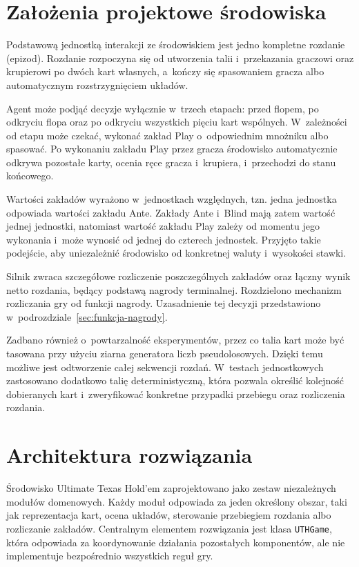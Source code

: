 \section{Założenia projektowe środowiska}
\label{sec:zalozenia-srodowiska}

Podstawową jednostką interakcji ze środowiskiem jest jedno kompletne rozdanie (epizod).
Rozdanie rozpoczyna się od utworzenia talii i~przekazania graczowi oraz
krupierowi po dwóch kart własnych, a~kończy się spasowaniem gracza albo
automatycznym rozstrzygnięciem układów.

Agent może podjąć decyzje wyłącznie w~trzech etapach: przed flopem, po odkryciu
flopa oraz po odkryciu wszystkich pięciu kart wspólnych. W~zależności od etapu
może czekać, wykonać zakład Play o~odpowiednim mnożniku albo spasować.
Po wykonaniu zakładu Play przez gracza środowisko automatycznie odkrywa pozostałe karty,
ocenia ręce gracza i~krupiera, i~przechodzi do stanu końcowego.

Wartości zakładów wyrażono w~jednostkach względnych, tzn. jedna jednostka
odpowiada wartości zakładu Ante. Zakłady Ante i~Blind mają zatem wartość
jednej jednostki, natomiast wartość zakładu Play zależy od momentu jego
wykonania i~może wynosić od jednej do czterech jednostek. Przyjęto takie
podejście, aby uniezależnić środowisko od konkretnej waluty i~wysokości stawki.

Silnik zwraca szczegółowe rozliczenie poszczególnych zakładów oraz łączny
wynik netto rozdania, będący podstawą nagrody terminalnej. Rozdzielono mechanizm
rozliczania gry od funkcji nagrody. Uzasadnienie tej decyzji przedstawiono
w~podrozdziale~\ref{sec:funkcja-nagrody}.

Zadbano również o~powtarzalność eksperymentów, przez co
talia kart może być tasowana przy użyciu ziarna generatora liczb
pseudolosowych. Dzięki temu możliwe jest odtworzenie całej sekwencji rozdań.
W~testach jednostkowych zastosowano dodatkowo talię deterministyczną,
która pozwala określić kolejność dobieranych kart i~zweryfikować
konkretne przypadki przebiegu oraz rozliczenia rozdania.

\section{Architektura rozwiązania}
\label{sec:architektura-srodowiska}

Środowisko Ultimate Texas Hold’em zaprojektowano jako zestaw niezależnych
modułów domenowych. Każdy moduł odpowiada za jeden określony obszar,
taki jak reprezentacja kart, ocena układów, sterowanie przebiegiem rozdania
albo rozliczanie zakładów. Centralnym elementem rozwiązania jest klasa
\texttt{UTHGame}, która odpowiada za koordynowanie działania pozostałych komponentów, ale nie
implementuje bezpośrednio wszystkich reguł gry.

